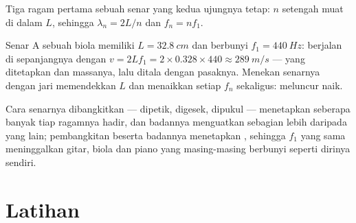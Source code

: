 \begin{omfigure}

{\small Tiga ragam pertama sebuah senar yang kedua ujungnya tetap: $n$
setengah  muat di dalam $L$, sehingga
$\lambda_n = 2L/n$ dan $f_n = nf_1$.}
\end{omfigure}

\begin{example}\label{ex:g12:sound-acoustics:violin}
Senar A sebuah biola memiliki $L = \qty{32.8}{cm}$ dan berbunyi
$f_1 = \qty{440}{Hz}$:  berjalan di sepanjangnya dengan
$v = 2Lf_1 = 2 \times 0.328 \times 440 \approx \qty{289}{m/s}$ --- yang
ditetapkan  dan massanya, lalu ditala dengan pasaknya. Menekan
senarnya dengan jari memendekkan $L$ dan menaikkan setiap $f_n$
sekaligus:  meluncur naik.
\end{example}

\begin{remark}\label{rem:g12:sound-acoustics:instruments}
Cara senarnya dibangkitkan --- dipetik, digesek, dipukul --- menetapkan
seberapa banyak tiap ragamnya hadir, dan badannya menguatkan sebagian
 lebih daripada yang lain; pembangkitan beserta badannya
menetapkan , sehingga $f_1$ yang sama meninggalkan gitar,
biola dan piano yang masing-masing berbunyi seperti dirinya sendiri.
\end{remark}

\section{Latihan}

